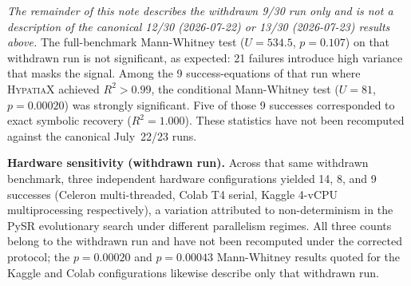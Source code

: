 \documentclass[twoside,11pt]{article}
\newcommand{\Rsq}{R^{2}}
\begin{document}
\emph{The remainder of this note describes the withdrawn 9/30 run only and
is not a description of the canonical 12/30 (2026-07-22) or 13/30
(2026-07-23) results above.} The full-benchmark Mann-Whitney test
($U=534.5$, $p=0.107$) on that withdrawn run is not significant, as
expected: 21 failures introduce high variance that masks the signal.
Among the 9 success-equations of that run where \textsc{HypatiaX} achieved
$\Rsq > 0.99$, the conditional Mann-Whitney test ($U=81$, $p=0.00020$) was
strongly significant. Five of those 9 successes corresponded to exact
symbolic recovery ($\Rsq = 1.000$). These statistics have not been
recomputed against the canonical July~22/23 runs.

\textbf{Hardware sensitivity (withdrawn run).}  Across that same withdrawn
benchmark, three independent hardware configurations yielded 14, 8, and 9
successes (Celeron multi-threaded, Colab T4 serial, Kaggle 4-vCPU
multiprocessing respectively), a variation attributed to non-determinism in
the PySR evolutionary search under different parallelism regimes. All three
counts belong to the withdrawn run and have not been recomputed under the
corrected protocol; the $p=0.00020$ and $p=0.00043$ Mann-Whitney results
quoted for the Kaggle and Colab configurations likewise describe only that
withdrawn run.
\end{document}

